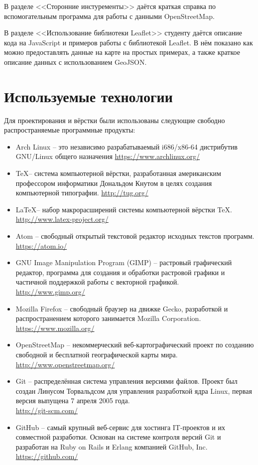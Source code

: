 \documentclass[a4paper, 14pt]{extreport}
\begin{document}
    В разделе <<Сторонние инстуременты>> даётся краткая справка по вспомогательным программа для 
    работы с данными OpenStreetMap. 

    В разделе <<Использование библиотеки Leaflet>> студенту даётся описание кода на JavaScript и 
    примеров работы с библиотекой Leaflet. В нём показано как можно предоставлять данные на 
    карте на простых примерах, а также краткое описание данных с использованием GeoJSON.

    \newpage

    \chapter{Используемые технологии}
    Для проектирования и вёрстки были использованы следующие свободно распространяемые программные 
    продукты:
    \begin{itemize}
        \item Arch Linux -- это независимо разрабатываемый i686/x86-64 дистрибутив GNU/Linux общего 
            назначения \url{https://www.archlinux.org/}
        \item \TeX -- система компьютерной вёрстки, разработанная американским профессором информатики 
            Дональдом Кнутом в целях создания компьютерной типографии.
            \url{http://tug.org/}
        \item \LaTeX -- набор макрорасширений системы компьютерной вёрстки TeX.\\
            \url{http://www.latex-project.org/}
        \item Atom -- свободный открытый текстовой редактор исходных текстов программ.
            \url{https://atom.io/}
        \item GNU Image Manipulation Program (GIMP) -- растровый графический редактор, программа для 
            создания и обработки растровой графики и частичной поддержкой работы с векторной графикой.\\
            \url{http://www.gimp.org/}
        \item Mozilla Firefox -- свободный браузер на движке Gecko, разработкой и распространением 
            которого занимается Mozilla Corporation.\\
            \url{https://www.mozilla.org/}
        \item OpenStreetMap -- некоммерческий веб-картографический проект по созданию свободной и 
            бесплатной географической карты мира.\\
            \url{http://www.openstreetmap.org/}
        \item Git -- распределённая система управления версиями файлов. Проект был создан Линусом 
            Торвальдсом для управления разработкой ядра Linux, первая версия выпущена 7 апреля 2005 года.\\
            \url{http://git-scm.com/}
        \item GitHub -- самый крупный веб-сервис для хостинга IT-проектов и их совместной разработки. 
            Основан на системе контроля версий Git и разработан на Ruby on Rails и Erlang компанией 
            GitHub, Inc.\\
            \url{https://github.com/}
    \end{itemize}
\end{document}
